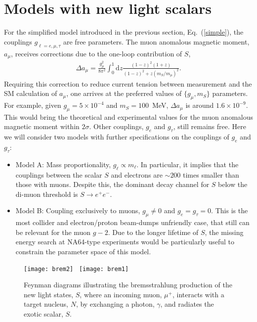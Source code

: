 \documentclass[prd,onecolumn,notitlepage,
nofootinbib,aps,tightenlines,
preprintnumbers,amsmath,amssymb,amsfonts,showpacs,superscriptaddress]{revtex4-1}
\renewcommand{\eqref}[1]{Eq.~(\ref{#1})}
\renewcommand{\d}{\text{d}}
\newcommand{\be}{\begin{eqnarray}}
\newcommand{\ee}{\end{eqnarray}}
\renewcommand{\d}{\text{d}}
\begin{document}
\section{Models with new light scalars}
\label{modelswithnewlightscalars}
%
For the simplified model introduced in the previous section, \eqref{simple}, the couplings $g_{\ell=e, \mu, \tau}$ are free parameters.  The muon anomalous magnetic moment, 
 $a_\mu$, receives corrections due to the one-loop contribution of $S$, 
\be
\Delta a_\mu = \frac{g_\mu^2}{8\pi^2}\int_0^1\d z \frac{(1-z)^2(1+z)}{(1-z)^2 + z (m_S/m_\mu)^2} .
\label{g-2}
\ee
Requiring this correction to reduce current tension between measurement and the SM calculation of 
$a_\mu$, one arrives at the preferred values of $\{g_\mu,m_S\}$ parameters. 
For example, given $g_\mu = 5\times 10^{-4} $ and $m_S = 100$~MeV, 
$\Delta a_\mu$ is around $1.6\times 10^{-9}$. This would bring the theoretical and experimental values for the muon anomalous magnetic moment within $2\sigma$.  Other couplings,  $g_e$ and $g_\tau$, still remains free.  Here we will consider 
two models with further  specifications on the couplings of $g_e$ and $g_\tau$:
\begin{itemize}
\item Model A:  Mass proportionality, $g_\ell \propto m_\ell$. In particular, it implies that the couplings between the scalar $S$ and  electrons are 
$\sim 200$ times smaller than those with muons. Despite this, the dominant decay channel for $S$ below the di-muon threshold  is $S\to e^+e^-$. 
\item Model B: Coupling exclusively to muons, $g_\mu \neq 0$ and $g_e=g_\tau = 0$. This is the most collider and electron/proton beam-dumps unfriendly
case, that still can be relevant for the muon $g-2$. Due to the longer lifetime of $S$, 
the  missing energy search at NA64-type experiments would be particularly useful to constrain the parameter space of 
this model. 
\end{itemize} 

\begin{figure}[t]
\centering
\texttt{[image: brem2]}\hspace*{1em}~
\texttt{[image: brem1]}\hspace*{2em}
\caption{\label{fig:brem} Feynman diagrams illustrating the bremsstrahlung production of the new light states, $S$, where an incoming muon, $\mu^+$, interacts with a target nucleus, $N$, by exchanging a photon, $\gamma$, and radiates the exotic scalar, $S$.}
\end{figure}
\end{document}
